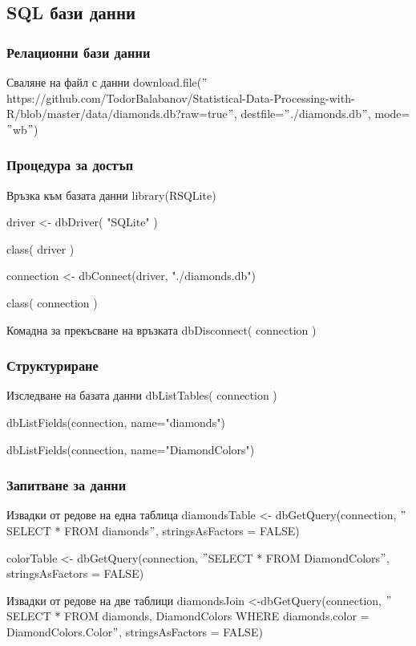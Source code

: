 \documentclass{beamer}
\begin{document}
\subsection{SQL бази данни}

\begin{frame}
\frametitle{Релационни бази данни}
\begin{block}{Сваляне на файл с данни}
download.file($"$https://github.com/TodorBalabanov/Statistical-Data-Processing-with-R/blob/master/data/diamonds.db?raw=true$"$, destfile=$"$./diamonds.db$"$, mode=$"$wb$"$)
\end{block}
\end{frame}

\begin{frame}
\frametitle{Процедура за достъп}
\begin{block}{Връзка към базата данни}
library(RSQLite)

driver <- dbDriver( "SQLite" )

class( driver )

connection <- dbConnect(driver, "./diamonds.db")

class( connection )
\end{block}

\begin{block}{Комадна за прекъсване на връзката}
dbDisconnect( connection )
\end{block}
\end{frame}

\begin{frame}
\frametitle{Структуриране}
\begin{block}{Изследване на базата данни}
dbListTables( connection )

dbListFields(connection, name="diamonds")

dbListFields(connection, name="DiamondColors")
\end{block}
\end{frame}

\begin{frame}
\frametitle{Запитване за данни}
\begin{block}{Извадки от редове на една таблица}
diamondsTable <- dbGetQuery(connection, $"$SELECT * FROM diamonds$"$, stringsAsFactors = FALSE)

colorTable <- dbGetQuery(connection, $"$SELECT * FROM DiamondColors$"$, stringsAsFactors = FALSE)
\end{block}

\begin{block}{Извадки от редове на две таблици}
diamondsJoin <-dbGetQuery(connection, $"$SELECT * FROM diamonds, DiamondColors WHERE diamonds.color = DiamondColors.Color$"$, stringsAsFactors = FALSE)
\end{block}
\end{frame}
\end{document}
